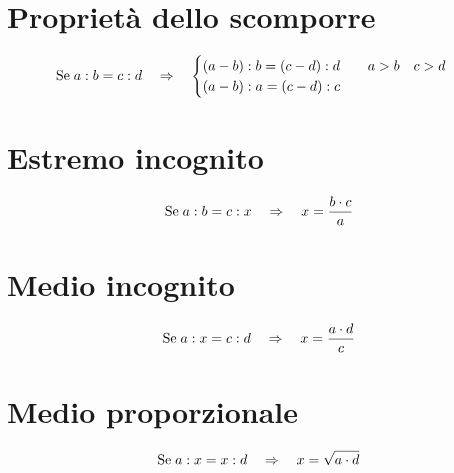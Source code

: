 \section{Proprietà dello scomporre}
\begin{equation}                       
\text{Se\;}a:b=c:d\quad\Rightarrow\quad \begin{cases}
(a-b):b=(c-d):d\qquad a>b\quad c>d\\
(a-b):a=(c-d):c
\end{cases}
\end{equation}
\section{Estremo incognito}
\begin{equation}                       
\text{Se\;}a:b=c:x\quad\Rightarrow\quad x=\dfrac{b\cdot c}{a}
\end{equation}
\section{Medio incognito}
\begin{equation}                       
\text{Se\;}a:x=c:d\quad\Rightarrow\quad x=\dfrac{a\cdot d}{c}
\end{equation}
\section{Medio proporzionale}
\begin{equation}                       
\text{Se\;}a:x=x:d\quad\Rightarrow\quad x=\sqrt{a\cdot d}
\end{equation}